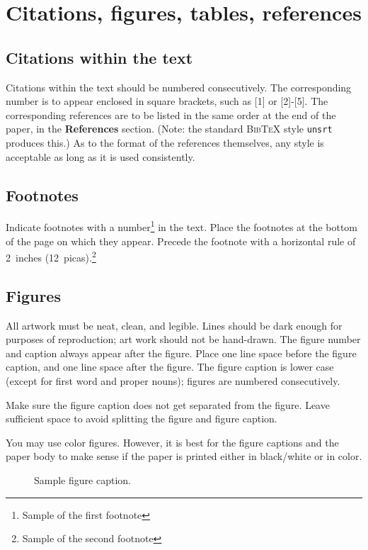 \documentclass{article} %
\begin{document}
\section{Citations, figures, tables, references}
\label{others}


\subsection{Citations within the text}

Citations within the text should be numbered consecutively. The corresponding
number is to appear enclosed in square brackets, such as [1] or [2]-[5]. The
corresponding references are to be listed in the same order at the end of the
paper, in the \textbf{References} section. (Note: the standard
\textsc{Bib\TeX} style \texttt{unsrt} produces this.) As to the format of the
references themselves, any style is acceptable as long as it is used
consistently.


\subsection{Footnotes}

Indicate footnotes with a number\footnote{Sample of the first footnote} in the
text. Place the footnotes at the bottom of the page on which they appear.
Precede the footnote with a horizontal rule of 2~inches
(12~picas).\footnote{Sample of the second footnote}

\subsection{Figures}

All artwork must be neat, clean, and legible. Lines should be dark
enough for purposes of reproduction; art work should not be
hand-drawn. The figure number and caption always appear after the
figure. Place one line space before the figure caption, and one line
space after the figure. The figure caption is lower case (except for
first word and proper nouns); figures are numbered consecutively.

Make sure the figure caption does not get separated from the figure.
Leave sufficient space to avoid splitting the figure and figure caption.

You may use color figures.
However, it is best for the
figure captions and the paper body to make sense if the paper is printed
either in black/white or in color.
\begin{figure}[h]
\begin{center}
\fbox{\rule[-.5cm]{0cm}{4cm} \rule[-.5cm]{4cm}{0cm}}
\end{center}
\caption{Sample figure caption.}
\end{figure}
\end{document}
